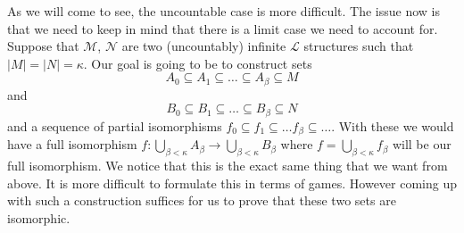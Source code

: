
As we will come to see, the uncountable case is more difficult. The issue now
is that we need to keep in mind that there is a limit case we need to account
for. Suppose that  $\mathcal{M}$, $\mathcal{N}$ are two (uncountably) infinite
$\mathcal{L}$ structures such that $|M| = |N| = \kappa$. Our goal is going to be to 
construct sets
\[
  A_0 \subseteq A_1 \subseteq \ldots \subseteq A_{\beta} \subseteq M
\] 
and
\[
B_0 \subseteq B_1 \subseteq \ldots \subseteq B_{\beta} \subseteq N
\] 
and a sequence of partial isomorphisms $f_0 \subseteq f_1 \subseteq \ldots
f_{\beta} \subseteq \ldots$. With these we would have a full isomorphism  $f:
\bigcup_{\beta < \kappa} A_{\beta} \to \bigcup_{\beta < \kappa} B_{\beta}$ 
where $f = \bigcup_{\beta < \kappa} f_{\beta}$ will be our full isomorphism. We
notice that this is the exact same thing that we want from above. It is more
difficult to formulate this in terms of games. However coming up with such
a construction suffices for us to prove that these two sets are isomorphic.


